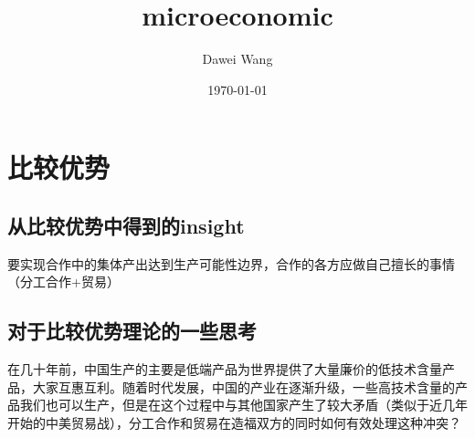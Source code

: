 \documentclass{article}
\title{microeconomic}
\author{Dawei Wang}
\date{\today}
\begin{document}
\maketitle
\section{比较优势}
\subsection{从比较优势中得到的insight}
要实现合作中的集体产出达到生产可能性边界，合作的各方应做自己擅长的事情（分工合作+贸易）
\subsection{对于比较优势理论的一些思考}
在几十年前，中国生产的主要是低端产品为世界提供了大量廉价的低技术含量产品，大家互惠互利。随着时代发展，中国的产业在逐渐升级，一些高技术含量的产品我们也可以生产，但是在这个过程中与其他国家产生了较大矛盾（类似于近几年开始的中美贸易战），分工合作和贸易在造福双方的同时如何有效处理这种冲突？
\end{document}
